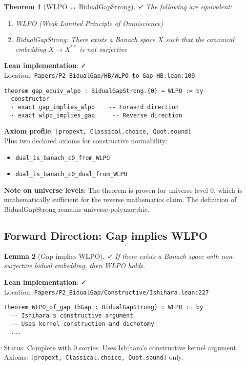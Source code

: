 \documentclass[11pt]{article}
\newtheorem{theorem}{Theorem}[section]
\newtheorem{lemma}[theorem]{Lemma}
\theoremstyle{definition}
\theoremstyle{remark}
\newcommand{\leanok}{\textcolor{green!70!black}{✓}}
\newcommand{\leanloc}[1]{\texttt{\footnotesize\color{blue!60!black}#1}}
\begin{document}
\begin{theorem}[WLPO ↔ BidualGapStrong]\label{thm:wlpo-gap} \leanok
The following are equivalent:
\begin{enumerate}
\item WLPO (Weak Limited Principle of Omniscience)
\item BidualGapStrong: There exists a Banach space \(X\) such that the canonical embedding \(X \to X^{**}\) is not surjective
\end{enumerate}
\end{theorem}

\begin{mdframed}[style=okbox]
\textbf{Lean implementation}: \leanok\\
Location: \leanloc{Papers/P2\_BidualGap/HB/WLPO\_to\_Gap\_HB.lean:109}\\
\begin{verbatim}
theorem gap_equiv_wlpo : BidualGapStrong.{0} ↔ WLPO := by
  constructor
  · exact gap_implies_wlpo    -- Forward direction
  · exact wlpo_implies_gap     -- Reverse direction
\end{verbatim}

\textbf{Axiom profile}: \texttt{[propext, Classical.choice, Quot.sound]}\\
Plus two declared axioms for constructive normability:
\begin{itemize}
\item \texttt{dual\_is\_banach\_c0\_from\_WLPO}
\item \texttt{dual\_is\_banach\_c0\_dual\_from\_WLPO}
\end{itemize}

\textbf{Note on universe levels}: The theorem is proven for universe level 0, which is mathematically sufficient for the reverse mathematics claim. The definition of BidualGapStrong remains universe-polymorphic.
\end{mdframed}

\subsection{Forward Direction: Gap implies WLPO}

\begin{lemma}[Gap implies WLPO]\label{lem:gap-wlpo} \leanok
If there exists a Banach space with non-surjective bidual embedding, then WLPO holds.
\end{lemma}

\begin{mdframed}[style=okbox]
\textbf{Lean implementation}: \leanok\\
Location: \leanloc{Papers/P2\_BidualGap/Constructive/Ishihara.lean:227}\\
\begin{verbatim}
theorem WLPO_of_gap (hGap : BidualGapStrong) : WLPO := by
  -- Ishihara's constructive argument
  -- Uses kernel construction and dichotomy
  ...
\end{verbatim}
Status: Complete with 0 sorries. Uses Ishihara's constructive kernel argument.\\
Axioms: \texttt{[propext, Classical.choice, Quot.sound]} only.
\end{mdframed}
\end{document}
